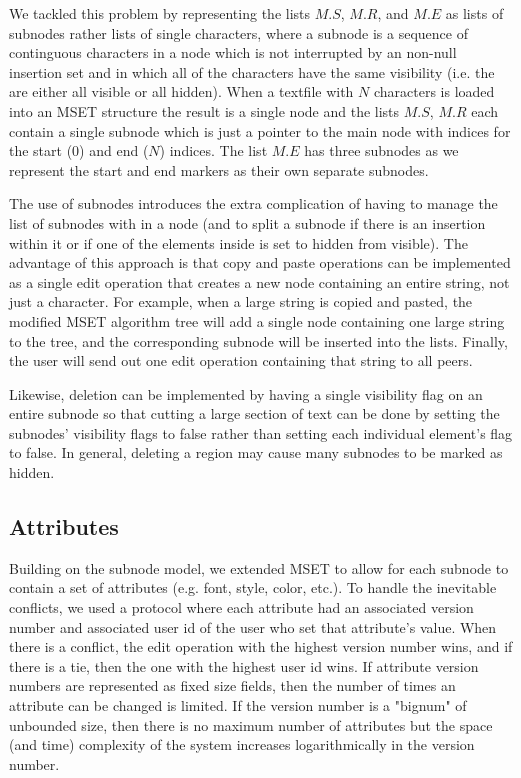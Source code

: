 \documentclass{amsart}
\begin{document}
We tackled this problem by representing the lists $M.S$, $M.R$, and $M.E$ as lists of subnodes rather lists of single characters, where a subnode is a sequence of continguous characters in a node which is not interrupted by an non-null insertion set and in which all of the characters have the same visibility (i.e. the are either all visible or all hidden).  When a textfile with $N$ characters is loaded into an MSET structure the
result is a single node and the lists $M.S$, $M.R$ each contain a single subnode which is just a pointer to the main node with indices for the start (0) and end ($N$) indices. The list $M.E$ has three subnodes as we represent the start and end markers as their own separate subnodes. 

The use of subnodes introduces the extra complication of having to manage the list of subnodes with in a node (and to split a subnode if there is an insertion within it or if one of the elements inside is set to hidden from visible).  The advantage of this approach is that copy and paste operations can be implemented as a single edit operation that creates a new node containing an entire string, not just a character.
For example, when a large string is copied and pasted, the modified MSET algorithm tree will add a single node
containing one large string to the tree, and the corresponding subnode will be
inserted into the lists. Finally, the user will send out one edit operation containing that string to all peers.

Likewise, deletion can be implemented by having a single visibility flag on an entire subnode so that cutting a large section of text can be done by setting the subnodes' visibility flags to false rather than setting each individual element's flag to false. In general, deleting a region may cause many subnodes to be marked as hidden.

\subsection{Attributes}
Building on the subnode model, we extended MSET to allow for each subnode to contain a set of attributes (e.g. font, style, color, etc.). To handle the inevitable conflicts, we used a protocol where each attribute had an associated version number and associated user id of the user who set that attribute's value.  When there is a conflict, the edit operation with the highest version number wins, and if there is a tie, then the one with the highest user id wins. If attribute version numbers are
represented as fixed size fields, then the number of times an attribute can be changed is limited.  If the version number is a "bignum" of unbounded size, then there is no maximum number of attributes but the space (and time) complexity of the system increases logarithmically in the version number.
\end{document}
